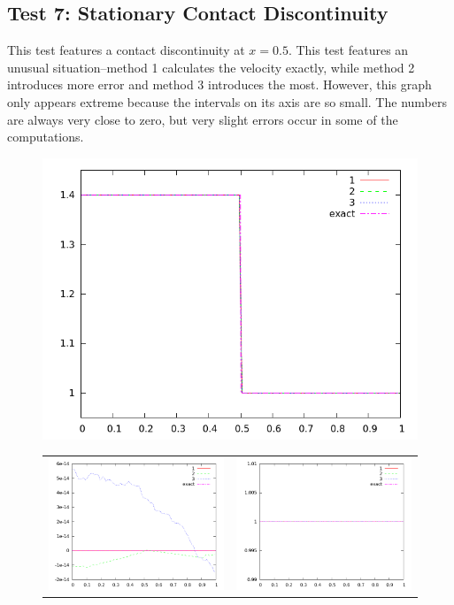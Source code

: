 \documentclass[10pt]{article}
\begin{document}
\clearpage

\subsection{Test 7: Stationary Contact Discontinuity}
This test features a contact discontinuity at $x=0.5$. This test features an unusual situation--method 1 calculates the velocity exactly, while method 2 introduces more error and method 3 introduces the most. However, this graph only appears extreme because the intervals on its axis are so small. The numbers are always very close to zero, but very slight errors occur in some of the computations. 

\begin{figure}[h]
  \begin{center}
     \includegraphics[width=.95\textwidth]{den_T7.png}	
	\begin{tabular}{cc}
      \includegraphics[width=.475\textwidth]{vel_T7.png} &
	  \includegraphics[width=.475\textwidth]{prs_T7.png}

\end{tabular}
\end{center}
\end{figure}
\end{document}
